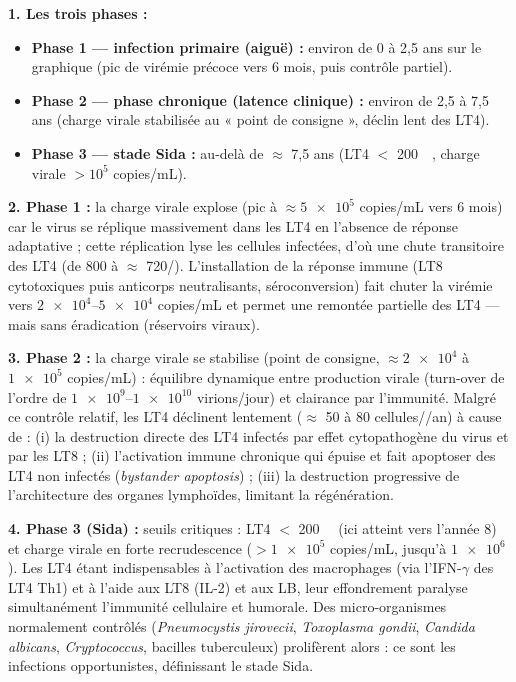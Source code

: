 \documentclass[11pt]{article}
\newcommand{\cle}[1]{{\popxbold\color{popdark}#1}}
\begin{document}
\begin{corrige}
\textbf{1. Les trois phases :}
\begin{itemize}
    \item \textbf{Phase 1 — infection primaire (aiguë) :} environ de 0 à 2,5 ans sur le graphique (pic de virémie précoce vers 6 mois, puis contrôle partiel).
    \item \textbf{Phase 2 — phase chronique (latence clinique) :} environ de 2,5 à 7,5 ans (charge virale stabilisée au « point de consigne », déclin lent des LT4).
    \item \textbf{Phase 3 — stade Sida :} au-delà de $\approx$ 7,5 ans (LT4 $<$ \SI{200}{\per\microliter}, charge virale $> 10^5$ copies/mL).
\end{itemize}

\textbf{2. Phase 1 :} la charge virale explose (pic à $\approx \num{5e5}$ copies/mL vers 6 mois) car le virus se réplique massivement dans les LT4 en l'absence de réponse adaptative ; cette réplication lyse les cellules infectées, d'où une chute transitoire des LT4 (de 800 à $\approx$ 720/\si{\microliter}). L'installation de la réponse immune (LT8 cytotoxiques puis anticorps neutralisants, séroconversion) fait chuter la virémie vers $\num{2e4}$--$\num{5e4}$ copies/mL et permet une remontée partielle des LT4 — mais sans éradication (réservoirs viraux).

\textbf{3. Phase 2 :} la charge virale se stabilise (point de consigne, $\approx \num{2e4}$ à $\num{1e5}$ copies/mL) : équilibre dynamique entre production virale (turn-over de l'ordre de $\num{1e9}$--$\num{1e10}$ virions/jour) et clairance par l'immunité. Malgré ce contrôle relatif, les LT4 déclinent lentement ($\approx$ 50 à 80 cellules/\si{\microliter}/an) à cause de : (i) la destruction directe des LT4 infectés par effet cytopathogène du virus et par les LT8 ; (ii) l'\cle{activation immune chronique} qui épuise et fait apoptoser des LT4 non infectés (\emph{bystander apoptosis}) ; (iii) la destruction progressive de l'architecture des organes lymphoïdes, limitant la régénération.

\textbf{4. Phase 3 (Sida) :} seuils critiques : LT4 $<$ \SI{200}{\per\microliter} (ici atteint vers l'année 8) et charge virale en forte recrudescence ($> \num{1e5}$ copies/mL, jusqu'à $\num{1e6}$). Les LT4 étant indispensables à l'activation des macrophages (via l'\cle{IFN-$\gamma$} des LT4 Th1) et à l'aide aux LT8 (IL-2) et aux LB, leur effondrement paralyse simultanément l'immunité cellulaire et humorale. Des micro-organismes normalement contrôlés (\emph{Pneumocystis jirovecii}, \emph{Toxoplasma gondii}, \emph{Candida albicans}, \emph{Cryptococcus}, bacilles tuberculeux) prolifèrent alors : ce sont les \cle{infections opportunistes}, définissant le stade Sida.
\end{corrige}
\end{document}
